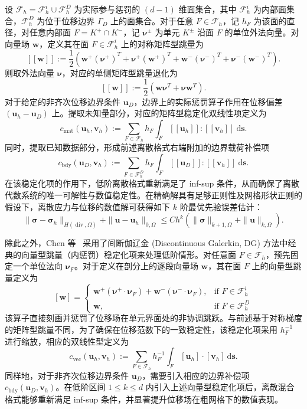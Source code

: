 设 $\mathcal{F}_h = \mathcal{F}_h^{i}\cup\mathcal{F}_h^{D}$ 为实际参与惩罚的 $(d-1)$ 维面集合，其中 $\mathcal{F}_h^{i}$ 为内部面集合，$\mathcal{F}_h^{D}$ 为位于位移边界 $\Gamma_D$ 上的面集合。对于任意 $F \in \mathcal{F}_h$，记 $h_F$ 为该面的直径，对任意内部面 $F = K^+\cap K^-$，记 $\boldsymbol{\nu}^{\pm}$ 为单元 $K^{\pm}$ 沿面 $F$ 的单位外法向量。对向量场 $\boldsymbol{w}$，定义其在面 $F \in \mathcal{F}_h^i$ 上的对称矩阵型跳量为
\[
[\![ \boldsymbol{w} ]\!] := \frac{1}{2}(\boldsymbol{w}^+(\boldsymbol{\nu}^+)^T + \boldsymbol{\nu}^+(\boldsymbol{w}^+)^T + \boldsymbol{w}^-(\boldsymbol{\nu}^-)^T + \boldsymbol{\nu}^-(\boldsymbol{w}^-)^T).
\] 
则取外法向量 $\boldsymbol{\nu}$，对应的单侧矩阵型跳量退化为
\[
[\![ \boldsymbol{w} ]\!] := \frac{1}{2}(\boldsymbol{w}\boldsymbol{\nu}^T + \boldsymbol{\nu}\boldsymbol{w}^T).
\]
对于给定的非齐次位移边界条件 $\boldsymbol{u}_D$，边界上的实际惩罚算子作用在位移偏差 $(\boldsymbol{u}_h - \boldsymbol{u}_D)$ 上。提取未知量部分，对应的矩阵型稳定化双线性项定义为
\[
c_{\text{mat}}(\boldsymbol{u}_h, \boldsymbol{v}_h) := \sum_{F \in \mathcal{F}_h} h_F \int_{F} [\![ \boldsymbol{u}_h ]\!] : [\![ \boldsymbol{v}_h ]\!] ~\mathrm{d}\boldsymbol{s}.
\]
同时，提取已知数据部分，形成前述离散格式右端附加的边界载荷补偿项
\[
c_{\text{bdy}}(\boldsymbol{u}_D, \boldsymbol{v}_h) := \sum_{F \in \mathcal{F}_h^D} h_F \int_{F} [\![ \boldsymbol{u}_D ]\!] : [\![ \boldsymbol{v}_h ]\!] ~\mathrm{d}\boldsymbol{s}.
\]
在该稳定化项的作用下，低阶离散格式重新满足了 inf-sup 条件，从而确保了离散代数系统的唯一可解性与数值稳定性。在精确解具有足够正则性及网格形状正则的假设下，离散应力与位移的数值解可获得如下 $k$ 阶最优先验误差估计：
\[
\|\boldsymbol{\sigma} - \boldsymbol{\sigma}_h\|_{H(\operatorname{div},\Omega)} + \|\boldsymbol{u} - \boldsymbol{u}_h\|_{0,\Omega} \le C h^k (\|\boldsymbol{\sigma}\|_{k+1,\Omega} + \|\boldsymbol{u}\|_{k,\Omega}).
\]

除此之外，Chen 等~\cite{chenFastAuxiliarySpace2017a} 采用了间断伽辽金 (Discontinuous Galerkin, DG) 方法中经典的向量型跳量（内惩罚）稳定化项来处理低阶情形。对任意面 $F\in\mathcal{F}_h$，预先固定一个单位法向 $\boldsymbol{\nu}_F$。对于定义在剖分上的逐段向量场 $\boldsymbol{w}$，其在面 $F$ 上的向量型跳量定义为
\[
[\boldsymbol{w}] =  
\begin{cases} 
	\boldsymbol{w}^+(\boldsymbol{\nu}^+\cdot\boldsymbol{\nu}_F) + \boldsymbol{w}^-(\boldsymbol{\nu}^-\cdot\boldsymbol{\nu}_F), & \text{if } F \in \mathcal{F}_h^i \\ \boldsymbol{w}, & \text{if } F \in \mathcal{F}_h^{D} 
\end{cases}
\]
该算子直接刻画并惩罚了位移场在单元界面处的非协调跳跃。与前述基于对称梯度的矩阵型跳量不同，为了确保在位移范数下的一致稳定性，该稳定化项采用 $h_F^{-1}$ 进行缩放，相应的双线性型定义为
\[
c_{\text{vec}}(\boldsymbol{u}_h, \boldsymbol{v}_h) := \sum_{F \in \mathcal{F}_h} h_F^{-1}\int_{F} [\boldsymbol{u}_h] \cdot [\boldsymbol{v}_h] ~ \mathrm{d}\boldsymbol{s}.
\]
同样地，对于非齐次位移边界条件 $\boldsymbol{u}_D$，需要引入相应的边界补偿项 $c_{\text{bdy}}(\boldsymbol{u}_D, \boldsymbol{v}_h)$。在低阶区间 $1 \le k \le d$ 内引入上述向量型稳定化项后，离散混合格式能够重新满足 inf-sup 条件，并显著提升位移场在粗网格下的数值表现。


